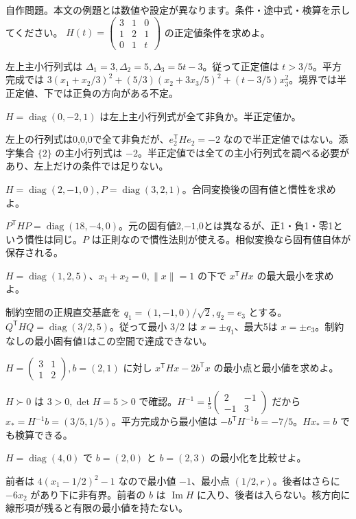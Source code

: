 \documentclass[11pt]{article}
\begin{document}
自作問題。本文の例題とは数値や設定が異なります。条件・途中式・検算を示してください。
\problem[Sylvesterの判定]
$H(t)=\begin{pmatrix}3&1&0\\1&2&1\\0&1&t\end{pmatrix}$ の正定値条件を求めよ。
\begin{ans}
左上主小行列式は $\Delta_1=3,\Delta_2=5,\Delta_3=5t-3$。従って正定値は $t>3/5$。平方完成では $3(x_1+x_2/3)^2+(5/3)(x_2+3x_3/5)^2+(t-3/5)x_3^2$。境界では半正定値、下では正負の方向がある不定。
\end{ans}
\problem[半正定値の落とし穴]
$H=\operatorname{diag}(0,-2,1)$ は左上主小行列式が全て非負か。半正定値か。
\begin{ans}
左上の行列式は0,0,0で全て非負だが、$e_2^{\mathsf T}He_2=-2$ なので半正定値ではない。添字集合 $\{2\}$ の主小行列式は $-2$。半正定値では全ての主小行列式を調べる必要があり、左上だけの条件では足りない。
\end{ans}
\newpage
\problem[慣性]
$H=\operatorname{diag}(2,-1,0),P=\operatorname{diag}(3,2,1)$。合同変換後の固有値と慣性を求めよ。
\begin{ans}
$P^{\mathsf T}HP=\operatorname{diag}(18,-4,0)$。元の固有値2,$-1$,0とは異なるが、正1・負1・零1という慣性は同じ。$P$ は正則なので慣性法則が使える。相似変換なら固有値自体が保存される。
\end{ans}
\problem[制約付きRayleigh商]
$H=\operatorname{diag}(1,2,5)$、$x_1+x_2=0,\|x\|=1$ の下で $x^{\mathsf T}Hx$ の最大最小を求めよ。
\begin{ans}
制約空間の正規直交基底を $q_1=(1,-1,0)/\sqrt2,q_2=e_3$ とする。$Q^{\mathsf T}HQ=\operatorname{diag}(3/2,5)$。従って最小 $3/2$ は $x=\pm q_1$、最大5は $x=\pm e_3$。制約なしの最小固有値1はこの空間で達成できない。
\end{ans}
\newpage
\problem[線形項付きの最小化]
$H=\begin{pmatrix}3&1\\1&2\end{pmatrix},b=(2,1)$ に対し $x^{\mathsf T}Hx-2b^{\mathsf T}x$ の最小点と最小値を求めよ。
\begin{ans}
$H\succ0$ は $3>0,\det H=5>0$ で確認。$H^{-1}=\frac15\begin{pmatrix}2&-1\\-1&3\end{pmatrix}$ だから $x_*=H^{-1}b=(3/5,1/5)$。平方完成から最小値は $-b^{\mathsf T}H^{-1}b=-7/5$。$Hx_*=b$ でも検算できる。
\end{ans}
\problem[半正定値と下に非有界]
$H=\operatorname{diag}(4,0)$ で $b=(2,0)$ と $b=(2,3)$ の最小化を比較せよ。
\begin{ans}
前者は $4(x_1-1/2)^2-1$ なので最小値 $-1$、最小点 $(1/2,r)$。後者はさらに $-6x_2$ があり下に非有界。前者の $b$ は $\operatorname{Im}H$ に入り、後者は入らない。核方向に線形項が残ると有限の最小値を持たない。
\end{ans}
\end{document}

